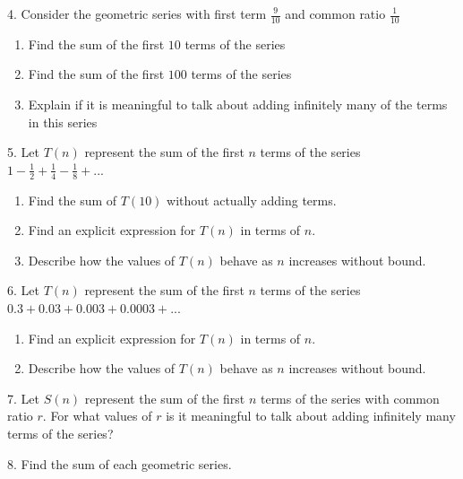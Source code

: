 \documentclass[10pt,]{book}
\theoremstyle{plain}
\theoremstyle{definition}
\theoremstyle{definition}
\theoremstyle{definition}
\numberwithin{equation}{section}
\begin{document}
\begin{exerciselist}
\item[4.]\hypertarget{exercise-35}{}Consider the geometric series with first term \(\frac{9}{10}\) and common ratio \(\frac{1}{10}\)%
\leavevmode%
\begin{enumerate}[label=(\alph*)]
\item\hypertarget{li-74}{}Find the sum of the first \(10\) terms of the series%
\item\hypertarget{li-75}{}Find the sum of the first \(100\) terms of the series%
\item\hypertarget{li-76}{}Explain if it is meaningful to talk about adding infinitely many of the terms in this series%
\end{enumerate}
\par\smallskip
\item[5.]\hypertarget{exercise-36}{}Let \(T(n)\) represent the sum of the first \(n\) terms of the series \(1 - \frac{1}{2} + \frac{1}{4} - \frac{1}{8} + ...\)%
\leavevmode%
\begin{enumerate}[label=(\alph*)]
\item\hypertarget{li-77}{}Find the sum of \(T(10)\) without actually adding terms.%
\item\hypertarget{li-78}{}Find an explicit expression for \(T(n)\) in terms of \(n\).%
\item\hypertarget{li-79}{}Describe how the values of \(T(n)\) behave as \(n\) increases without bound.%
\end{enumerate}
\par\smallskip
\item[6.]\hypertarget{exercise-37}{}Let \(T(n)\) represent the sum of the first \(n\) terms of the series \(0.3 + 0.03 + 0.003 + 0.0003 + ...\)%
\leavevmode%
\begin{enumerate}[label=(\alph*)]
\item\hypertarget{li-80}{}Find an explicit expression for \(T(n)\) in terms of \(n\).%
\item\hypertarget{li-81}{}Describe how the values of \(T(n)\) behave as \(n\) increases without bound.%
\end{enumerate}
\par\smallskip
\item[7.]\hypertarget{exercise-38}{}Let \(S(n)\) represent the sum of the first \(n\) terms of the series with common ratio \(r\). For what values of \(r\) is it meaningful to talk about adding infinitely many terms of the series?%
\par\smallskip
\item[8.]\hypertarget{exercise-39}{}Find the sum of each geometric series.%

\end{exerciselist}
\end{document}
